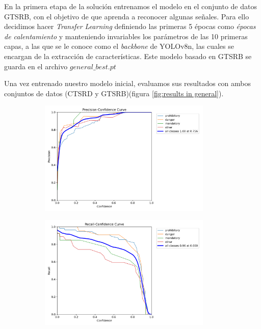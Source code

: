 \documentclass{article}
\begin{document}
En la primera etapa de la solución entrenamos el modelo en el conjunto de datos GTSRB, con el objetivo de que aprenda a reconocer algunas señales. Para ello decidimos hacer \textit{Transfer Learning} definiendo las primeras 5 épocas como \textit{épocas de calentamiento} y manteniendo invariables los parámetros de las 10 primeras capas, a las que se le conoce como el \textit{backbone} de YOLOv8n, las cuales se encargan de la extracción de características. Este modelo basado en GTSRB se guarda en el archivo $general\_best.pt$ 

Una vez entrenado nuestro modelo inicial, evaluamos sus resultados con ambos conjuntos de datos (CTSRD y GTSRB)(figura \ref{fig:results in general}).

\begin{figure}[h]
\begin{subfigure}[b]{0.5\textwidth}
\centering
\includegraphics[width=0.9\textwidth]{resources/general in general P curve.png}
\caption{}
\end{subfigure}
\begin{subfigure}[b]{0.5\textwidth}
\centering
\includegraphics[width=0.9\textwidth]{resources/general in general R curve.png}

\end{subfigure}
\end{figure}
\end{document}
